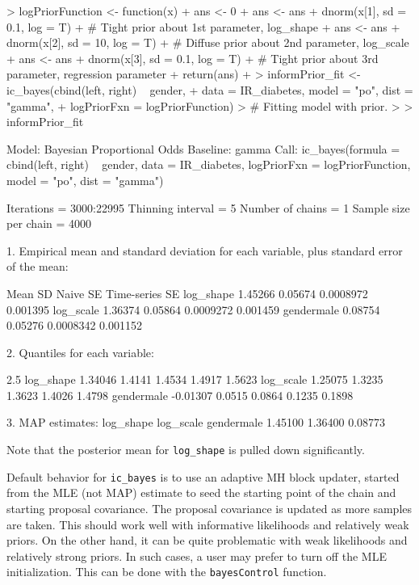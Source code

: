 \documentclass[a4paper]{article}
\begin{document}
\begin{Schunk}
\begin{Sinput}
>  logPriorFunction <- function(x){
+    ans <- 0 
+    ans <- ans + dnorm(x[1], sd = 0.1, log = T)
+    # Tight prior about 1st parameter, log_shape
+    ans <- ans + dnorm(x[2], sd = 10, log = T)
+    # Diffuse prior about 2nd parameter, log_scale
+    ans <- ans + dnorm(x[3], sd = 0.1, log = T)
+    # Tight prior about 3rd parameter, regression parameter
+    return(ans)
+  }    
> informPrior_fit <- ic_bayes(cbind(left, right) ~ gender,
+     data = IR_diabetes, model = "po", dist = "gamma",
+     logPriorFxn = logPriorFunction)
> # Fitting model with prior. 
> 
> informPrior_fit
\end{Sinput}
\begin{Soutput}
Model:  Bayesian Proportional Odds
Baseline:  gamma 
Call: ic_bayes(formula = cbind(left, right) ~ gender, data = IR_diabetes, 
    logPriorFxn = logPriorFunction, model = "po", dist = "gamma")


Iterations = 3000:22995
Thinning interval = 5 
Number of chains = 1 
Sample size per chain = 4000 

1. Empirical mean and standard deviation for each variable,
   plus standard error of the mean:

              Mean      SD  Naive SE Time-series SE
log_shape  1.45266 0.05674 0.0008972       0.001395
log_scale  1.36374 0.05864 0.0009272       0.001459
gendermale 0.08754 0.05276 0.0008342       0.001152

2. Quantiles for each variable:

               2.5%
log_shape   1.34046 1.4141 1.4534 1.4917 1.5623
log_scale   1.25075 1.3235 1.3623 1.4026 1.4798
gendermale -0.01307 0.0515 0.0864 0.1235 0.1898

3. MAP estimates:
 log_shape  log_scale gendermale 
   1.45100    1.36400    0.08773 
\end{Soutput}
\end{Schunk}

Note that the posterior mean for \texttt{log\_shape} is pulled down significantly. 

Default behavior for \texttt{ic\_bayes} is to use an adaptive MH block updater, started from the MLE (not MAP) estimate to seed the starting point of the chain and starting proposal covariance. The proposal covariance is updated as more samples are taken. This should work well with informative likelihoods and relatively weak priors. On the other hand, it can be quite problematic with weak likelihoods and relatively strong priors. In such cases, a user may prefer to turn off the MLE initialization. This can be done with the \texttt{bayesControl} function. 
\end{document}
